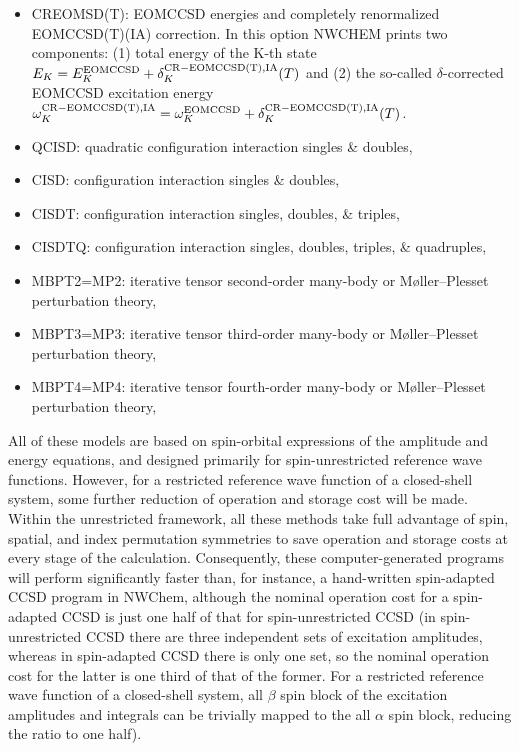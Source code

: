 \begin{itemize}
\item CREOMSD(T): EOMCCSD energies and completely renormalized EOMCCSD(T)(IA) correction.
In this option NWCHEM prints two components: (1) total energy of the K-th state 
$E_K=E_K^{\rm EOMCCSD}+\delta_K^{\rm CR-EOMCCSD(T),IA}(T)$ and (2)
the so-called $\delta$-corrected EOMCCSD excitation energy
$\omega_K^{\rm CR-EOMCCSD(T),IA}=\omega_K^{\rm EOMCCSD}+\delta_K^{\rm CR-EOMCCSD(T),IA}(T)$.
\item QCISD: quadratic configuration interaction singles \& doubles,
\item CISD: configuration interaction singles \& doubles,
\item CISDT: configuration interaction singles, doubles, \& triples,
\item CISDTQ: configuration interaction singles, doubles, triples, \& quadruples,
\item MBPT2=MP2: iterative tensor second-order many-body or M\o ller--Plesset perturbation theory,
\item MBPT3=MP3: iterative tensor third-order many-body or M\o ller--Plesset perturbation theory,
\item MBPT4=MP4: iterative tensor fourth-order many-body or M\o ller--Plesset perturbation theory,
\end{itemize}

All of these models are based on spin-orbital expressions of the amplitude and energy equations, 
and designed primarily for spin-unrestricted reference wave functions.  However, for a restricted 
reference wave function of a closed-shell system, some further reduction of operation and storage
cost will be made.  Within the unrestricted framework, all these methods take full advantage
of spin, spatial, and index permutation symmetries to save operation and storage costs at every
stage of the calculation.  Consequently, these computer-generated programs will perform significantly
faster than, for instance, a hand-written spin-adapted CCSD program in NWChem, although the nominal 
operation cost for a spin-adapted CCSD is just one half of that for spin-unrestricted CCSD (in spin-unrestricted
CCSD there are three independent sets of excitation amplitudes, whereas in spin-adapted CCSD there
is only one set, so the nominal operation cost for the latter is one third of that of the former.  For 
a restricted reference wave function of a closed-shell system, all $\beta$ spin block of the excitation
amplitudes and integrals can be trivially mapped to the all $\alpha$ spin block, reducing the ratio
to one half).

